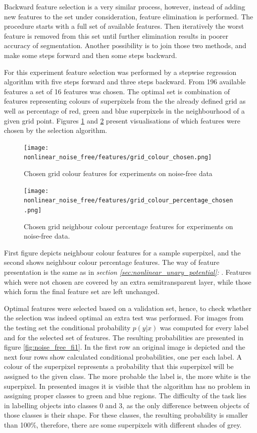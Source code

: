 Backward feature selection is a very similar process, however, instead of adding new features to the set under consideration, feature elimination is performed. The procedure starts with a full set of available features. Then iteratively the worst feature is removed from this set until further elimination results in poorer accuracy of segmentation. Another possibility is to join those two methods, and make some steps forward and then some steps backward.

For this experiment feature selection was performed by a stepwise regression algorithm with five steps forward and three steps backward. From 196 available features a set of 16 features was chosen. The optimal set is combination of features representing colours of superpixels from the the already defined grid as well as percentage of red, green and blue superpixels in the neighbourhood of a given grid point. Figures \ref{fig:nonlinear_noise_free_features_colour} and \ref{fig:nonlinear_noise_free_features_percentage} present visualisations of which features were chosen by the selection algorithm.
\begin{figure}
    \centering
    \texttt{[image: nonlinear\_noise\_free/features/grid\_colour\_chosen.png]}
    \caption{Chosen grid colour features for experiments on noise-free data}
    \label{fig:nonlinear_noise_free_features_colour}
\end{figure}
\begin{figure}
    \centering
    \texttt{[image: nonlinear\_noise\_free/features/grid\_colour\_percentage\_chosen.png]}
    \caption{Chosen grid neighbour colour percentage features for experiments on noise-free data.}
    \label{fig:nonlinear_noise_free_features_percentage}
\end{figure}
First figure depicts neighbour colour features for a sample superpixel, and the second shows neighbour colour percentage features. The way of feature presentation is the same as in \textit{section \ref{sec:nonlinear_unary_potential}: }. Features which were not chosen are covered by an extra semitransparent layer, while those which form the final feature set are left unchanged.

Optimal features were selected based on a validation set, hence, to check whether the selection was indeed optimal an extra test was performed. For images from the testing set the conditional probability $p(y|x)$ was computed for every label and for the selected set of features. The resulting probabilities are presented in figure \ref{fig:noise_free_fi1}.
In the first row an original image is depicted and the next four rows show calculated conditional probabilities, one per each label. A colour of the superpixel represents a probability that this superpixel will be assigned to the given class. The more probable the label is, the more white is the superpixel. In presented images it is visible that the algorithm has no problem in assigning proper classes to green and blue regions. The difficulty of the task lies in labelling objects into classes 0 and 3, as the only difference between objects of those classes is their shape. For these classes, the resulting probability is smaller than 100\%, therefore, there are some superpixels with different shades of grey. 

